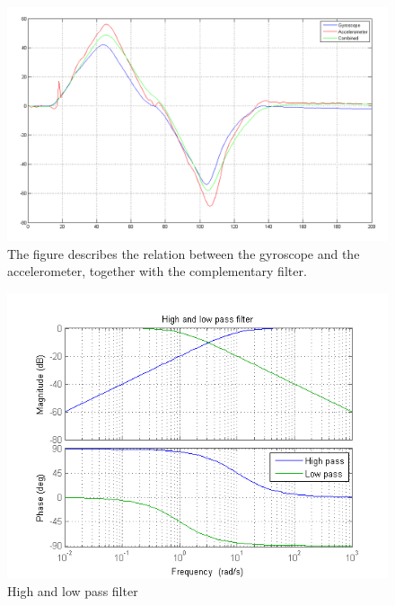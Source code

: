 \documentclass[a4paper]{article}
\begin{document}
\begin{figure}[H]
 \centering
\includegraphics[scale=0.456]{pic/GyroAccCombAng.png}
\caption{The figure describes the relation between the gyroscope and the accelerometer, together with the complementary filter.}
\end{figure}

\begin{figure}[H]
  \centering
\includegraphics[scale=0.89]{pic/HP_LP.png}
\caption{High and low pass filter}
\end{figure}
\end{document}
